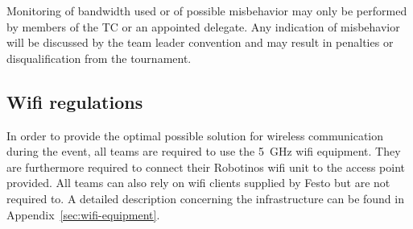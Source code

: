\documentclass[12pt,twoside]{article}
\newenvironment{rulechange}{}{}
\begin{document}
Monitoring of bandwidth used or of possible misbehavior may only be
performed by members of the TC or an appointed delegate.
Any indication of misbehavior will be discussed by the team leader
convention and may result in penalties or disqualification from the
tournament.



\subsection{Wifi regulations}
\label{sec:wifi-regulations}
In order to provide the optimal possible solution for wireless
communication during the event, all teams are required to use the
\SI{5}{\giga\hertz} wifi equipment. They are furthermore required to
connect their Robotinos wifi unit to the access point provided. All
teams can also rely on wifi clients supplied by Festo but are not
required to. A detailed description concerning the infrastructure can
be found in Appendix~\ref{sec:wifi-equipment}.

\end{document}
